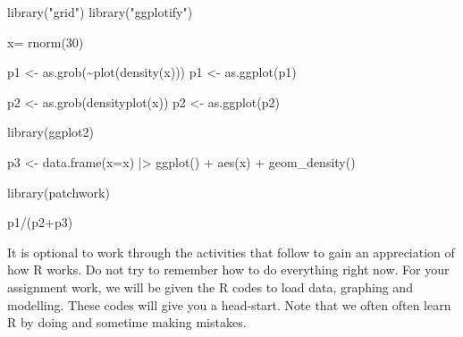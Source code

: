 \documentclass[
  letterpaper,
  DIV=11,
  numbers=noendperiod]{scrreprt}
\newenvironment{Shaded}{\begin{snugshade}}{\end{snugshade}}
\newcommand{\AttributeTok}[1]{\textcolor[rgb]{0.40,0.45,0.13}{#1}}
\newcommand{\DecValTok}[1]{\textcolor[rgb]{0.68,0.00,0.00}{#1}}
\newcommand{\FunctionTok}[1]{\textcolor[rgb]{0.28,0.35,0.67}{#1}}
\newcommand{\NormalTok}[1]{\textcolor[rgb]{0.00,0.23,0.31}{#1}}
\newcommand{\OtherTok}[1]{\textcolor[rgb]{0.00,0.23,0.31}{#1}}
\newcommand{\SpecialCharTok}[1]{\textcolor[rgb]{0.37,0.37,0.37}{#1}}
\newcommand{\StringTok}[1]{\textcolor[rgb]{0.13,0.47,0.30}{#1}}
\begin{document}
\begin{Shaded}
\begin{Highlighting}[]
\FunctionTok{library}\NormalTok{(}\StringTok{"grid"}\NormalTok{)}
\FunctionTok{library}\NormalTok{(}\StringTok{"ggplotify"}\NormalTok{)}

\NormalTok{x}\OtherTok{=} \FunctionTok{rnorm}\NormalTok{(}\DecValTok{30}\NormalTok{)}

\NormalTok{p1 }\OtherTok{\textless{}{-}} \FunctionTok{as.grob}\NormalTok{(}\SpecialCharTok{\textasciitilde{}}\FunctionTok{plot}\NormalTok{(}\FunctionTok{density}\NormalTok{(x)))}
\NormalTok{p1 }\OtherTok{\textless{}{-}} \FunctionTok{as.ggplot}\NormalTok{(p1)}

\NormalTok{p2 }\OtherTok{\textless{}{-}} \FunctionTok{as.grob}\NormalTok{(}\FunctionTok{densityplot}\NormalTok{(x))}
\NormalTok{p2 }\OtherTok{\textless{}{-}} \FunctionTok{as.ggplot}\NormalTok{(p2)}

\FunctionTok{library}\NormalTok{(ggplot2)}

\NormalTok{p3 }\OtherTok{\textless{}{-}} \FunctionTok{data.frame}\NormalTok{(}\AttributeTok{x=}\NormalTok{x) }\SpecialCharTok{|\textgreater{}} 
  \FunctionTok{ggplot}\NormalTok{() }\SpecialCharTok{+} 
  \FunctionTok{aes}\NormalTok{(x) }\SpecialCharTok{+}
  \FunctionTok{geom\_density}\NormalTok{()}

\FunctionTok{library}\NormalTok{(patchwork)}

\NormalTok{p1}\SpecialCharTok{/}\NormalTok{(p2}\SpecialCharTok{+}\NormalTok{p3)}
\end{Highlighting}
\end{Shaded}

\begin{tcolorbox}[enhanced jigsaw, leftrule=.75mm, toptitle=1mm, breakable, bottomrule=.15mm, rightrule=.15mm, titlerule=0mm, arc=.35mm, toprule=.15mm, colback=white, colframe=quarto-callout-tip-color-frame, left=2mm, coltitle=black, bottomtitle=1mm, opacitybacktitle=0.6, colbacktitle=quarto-callout-tip-color!10!white, title=\textcolor{quarto-callout-tip-color}{\faLightbulb}\hspace{0.5em}{Tip}, opacityback=0]

It is optional to work through the activities that follow to gain an
appreciation of how R works. Do not try to remember how to do everything
right now. For your assignment work, we will be given the R codes to
load data, graphing and modelling. These codes will give you a
head-start. Note that we often often learn R by doing and sometime
making mistakes.

\end{tcolorbox}
\end{document}
